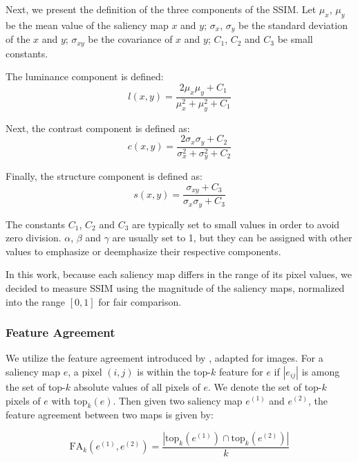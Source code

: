 Next, we present the definition of the three components of the SSIM. Let $\mu_x$, $\mu_y$ be the mean value of the saliency map $x$ and $y$; $\sigma_x$, $\sigma_y$ be the standard deviation of the $x$ and $y$; $\sigma_{xy}$ be the covariance of $x$ and $y$; $C_1$, $C_2$ and $C_3$ be small constants.

The luminance component is defined:
\begin{equation}
    l(x,y) = \frac{2\mu_x\mu_y + C_1}{\mu_x^2 + \mu_y^2 + C_1}
\end{equation}

Next, the contrast component is defined as:
\begin{equation}
    c(x,y) = \frac{2\sigma_x\sigma_y + C_2}{\sigma_x^2 + \sigma_y^2 + C_2}
\end{equation}

Finally, the structure component is defined as:
\begin{equation}
    s(x,y) = \frac{\sigma_{xy} + C_3}{\sigma_x\sigma_y + C_3}
\end{equation}

The constants $C_1$, $C_2$ and $C_3$ are typically set to small values in order to avoid zero division. $\alpha$, $\beta$ and $\gamma$ are usually set to 1, but they can be assigned with other values to emphasize or deemphasize their respective components.

In this work, because each saliency map differs in the range of its pixel values, we decided to measure SSIM using the magnitude of the saliency maps, normalized into the range $[0, 1]$ for fair comparison.

\subsubsection{Feature Agreement}
We utilize the feature agreement introduced by \cite{krishna_disagreement_problem}, adapted for images. For a saliency map $e$, a pixel $(i, j)$ is within the top-$k$ feature for $e$ if $|e_{ij}|$ is among the set of top-$k$ absolute values of all pixels of $e$. We denote the set of top-$k$ pixels of $e$ with $\text{top}_{k}(e)$. Then given two saliency map $e^{(1)}$ and $e^{(2)}$, the feature agreement between two maps is given by:

\begin{equation}
    \text{FA}_k(e^{(1)}, e^{(2)}) = \frac{|\text{top}_{k}(e^{(1)}) \cap \text{top}_{k}(e^{(2)})|}{k}
\end{equation}

